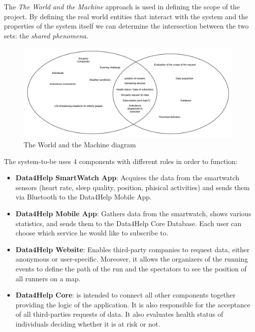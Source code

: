 

The \textit{The World and the Machine} approach is used in defining the scope of the project.
By defining the real world entities that interact with the system and the properties of the system itself we can determine the intersection between the two sets: the \textit{shared phenomena}.

\begin{figure}[H]
	\includegraphics[width=\textwidth,height=\textheight,keepaspectratio]{assets/twatm.pdf}
	\caption{The World and the Machine diagram}
	\label{fig:TWATM}
\end{figure}

The system-to-be uses 4 components with different roles in order to function:
\begin{itemize}
    \item \textbf{Data4Help SmartWatch App}: Acquires the data from the smartwatch sensors (heart rate, sleep quality, position, phisical activities) and sends them via Bluetooth to the Data4Help Mobile App.
    \item \textbf{Data4Help Mobile App}: Gathers data from the smartwatch, shows various statistics, and sends them to the Data4Help Core Database. Each user can choose which service he would like to subscribe to.
    \item \textbf{Data4Help Website}: Enables third-party companies to request data, either anonymous or user-specific. Moreover, it allows the organizers of the running events  to define the path of the run and the spectators to see the position of all runners on a map.
    \item \textbf{Data4Help Core}: is intended to connect all other components together providing the logic of the application. It is also responsible for the acceptance of all third-parties requests of data. It also evaluates health status of individuals deciding whether it is at risk or not.
\end{itemize}

